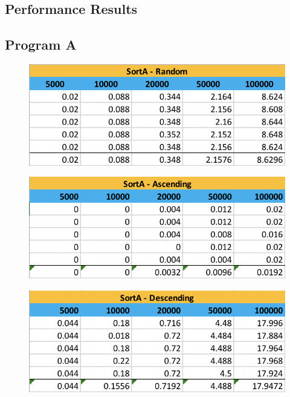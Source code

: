 \documentclass[a4paper]{article}
\begin{document}
\begin{appendices}
\section{Performance Results}
\subsection{Program A}
	\begin{figure}[h!]
	\begin{center}
	\includegraphics[width=\linewidth]{A_R.png}
	\end{center}
	\end{figure}
\pagebreak
	\begin{figure}[h!]
	\begin{center}
	\includegraphics[width=\linewidth]{A_S.png}
	\end{center}
	\end{figure}

	\begin{figure}[h!]
	\begin{center}
	\includegraphics[width=\linewidth]{A_Re.png}
	\end{center}
	\end{figure}


\end{appendices}
\end{document}
